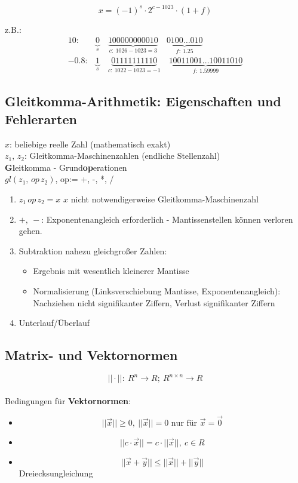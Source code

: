 \[ x = (-1)^s \cdot 2 ^{c-1023}\cdot (1 + f)\]

z.B.: 
\begin{align*}
10:& \underbrace{0}_{s} \quad \underbrace{100000000010}_{c:\ 1026-1023=3}\quad\underbrace{0100\ldots010}_{f:\ \num{1.25}}\\
\num{-0.8}:& \underbrace{1}_{s} \quad \underbrace{01111111110}_{c:\ 1022-1023=-1}\quad\underbrace{10011001\ldots10011010}_{f:\ \num{1.59999}}
\end{align*}

\subsection{Gleitkomma-Arithmetik: Eigenschaften und Fehlerarten}
$x$: beliebige reelle Zahl (mathematisch exakt)\\
$z_1,\,z_2$: Gleitkomma-Maschinenzahlen (endliche Stellenzahl)\\
\textbf{Gl}eitkomma - Grund\textbf{op}erationen\\
$gl(z_1,\, op\, z_2)$, op:= +, -, *, /
\begin{enumerate}[label=\alph*)]
\item $z_1 \, op\, z_2 = x$ \quad $x$ nicht notwendigerweise Gleitkomma-Maschinenzahl
\item $+,\ -$: Exponentenangleich erforderlich - Mantissenstellen können verloren gehen.
\item Subtraktion nahezu gleichgroßer Zahlen:
	\begin{itemize}
	\item Ergebnis mit wesentlich kleinerer Mantisse
	\item Normalisierung (Linksverschiebung Mantisse, Exponentenangleich): Nachziehen nicht signifikanter Ziffern, Verlust signifikanter Ziffern
	\end{itemize}
\item Unterlauf/Überlauf
\end{enumerate}

\subsection{Matrix- und Vektornormen}

\[||\cdot||:\ R^n \rightarrow R;\ R^{n\times n} \rightarrow R\]\\
Bedingungen für \textbf{Vektornormen}:
\begin{itemize}
\item \[||\vec{x}|| \geq 0,\ ||\vec{x}|| = 0 \text{ nur für } \vec{x} = \vec{0}\]
\item \[||c \cdot\vec{x}|| = c \cdot ||\vec{x}||,\ c \in R\]
\item \[||\vec{x} + \vec{y}|| \leq ||\vec{x}|| + ||\vec{y}||\] Dreiecksungleichung
\end{itemize}

